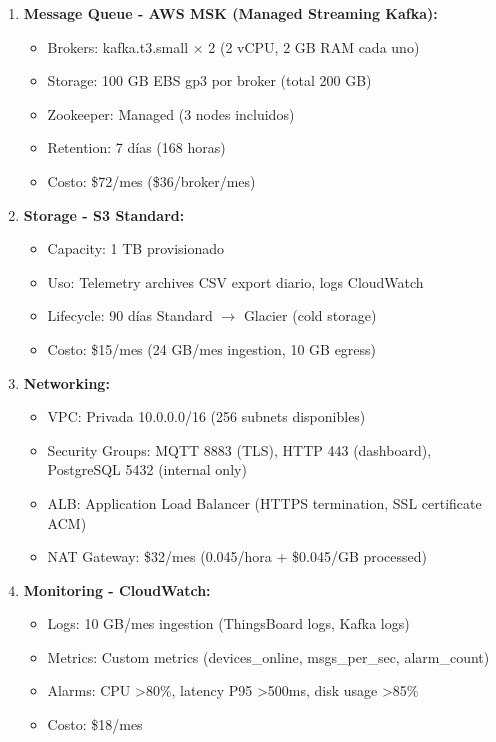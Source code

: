 \begin{enumerate}
    \item \textbf{Message Queue - AWS MSK (Managed Streaming Kafka):}
    \begin{itemize}
        \item Brokers: kafka.t3.small $\times$ 2 (2 vCPU, 2 GB RAM cada uno)
        \item Storage: 100 GB EBS gp3 por broker (total 200 GB)
        \item Zookeeper: Managed (3 nodes incluidos)
        \item Retention: 7 días (168 horas)
        \item Costo: \$72/mes (\$36/broker/mes)
    \end{itemize}
    
    \item \textbf{Storage - S3 Standard:}
    \begin{itemize}
        \item Capacity: 1 TB provisionado
        \item Uso: Telemetry archives CSV export diario, logs CloudWatch
        \item Lifecycle: 90 días Standard $\rightarrow$ Glacier (cold storage)
        \item Costo: \$15/mes (24 GB/mes ingestion, 10 GB egress)
    \end{itemize}
    
    \item \textbf{Networking:}
    \begin{itemize}
        \item VPC: Privada 10.0.0.0/16 (256 subnets disponibles)
        \item Security Groups: MQTT 8883 (TLS), HTTP 443 (dashboard), PostgreSQL 5432 (internal only)
        \item ALB: Application Load Balancer (HTTPS termination, SSL certificate ACM)
        \item NAT Gateway: \$32/mes (0.045/hora + \$0.045/GB processed)
    \end{itemize}
    
    \item \textbf{Monitoring - CloudWatch:}
    \begin{itemize}
        \item Logs: 10 GB/mes ingestion (ThingsBoard logs, Kafka logs)
        \item Metrics: Custom metrics (devices\_online, msgs\_per\_sec, alarm\_count)
        \item Alarms: CPU >80\%, latency P95 >500ms, disk usage >85\%
        \item Costo: \$18/mes
    \end{itemize}
\end{enumerate}

